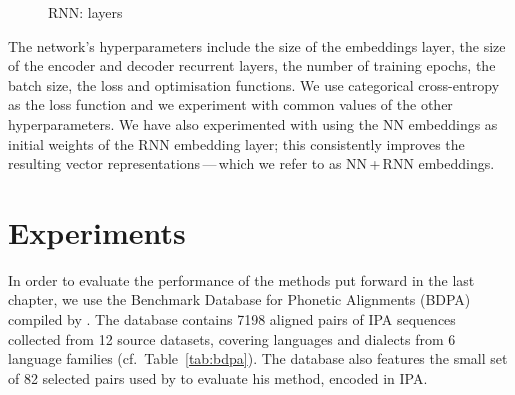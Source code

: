 \documentclass[a4paper]{report}
\begin{document}
\begin{figure}[h]
	\centering\small


	\caption{RNN: layers}
	\label{fig:rnn}
\end{figure}

The network's hyperparameters include the size of the embeddings layer, the size of the encoder and decoder recurrent layers,
the number of training epochs, the batch size, the loss and optimisation functions.
We use categorical cross-entropy as the loss function and we experiment with common values of the other hyperparameters.
We have also experimented with using the NN embeddings as initial weights of the RNN embedding layer;
this consistently improves the resulting vector representations\,---\,which we refer to as NN\,+\,RNN embeddings.


\chapter{Experiments}

In order to evaluate the performance of the methods put forward in the last chapter,
we use the Benchmark Database for Phonetic Alignments (BDPA) compiled by \citet{2014_List_Prokić}.
The database contains 7198 aligned pairs of IPA sequences collected from 12 source datasets,
covering languages and dialects from 6 language families (cf.~Table~\ref{tab:bdpa}).
The database also features the small set of 82 selected pairs used by \citet{1996_Covington} to evaluate his method, encoded in IPA.
\end{document}
